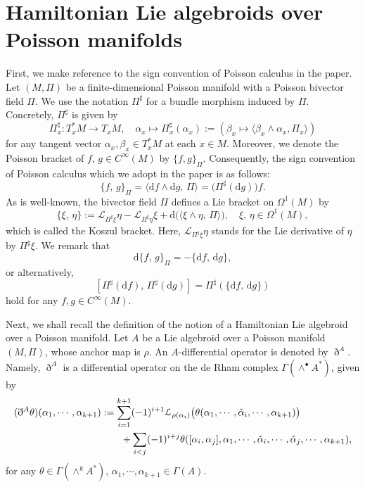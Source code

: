 \documentclass[a4paper,11pt,dvipdfmx]{article}
\numberwithin{equation}{section}
\begin{document}
\section{Hamiltonian Lie algebroids over Poisson manifolds}
First, we make reference to the sign convention of Poisson calculus in the paper. Let $(M,\Pi)$ be a finite-dimensional Poisson manifold with a Poisson bivector field $\Pi$. 
We use the notation $\Pi^{\sharp}$ for a bundle morphism induced by $\Pi$. Concretely, $\Pi^{\sharp}$ is given by 
\begin{equation}\label{sec2:eqn_sign convention}
\Pi^{\sharp}_x:T_x^*M \longrightarrow T_xM,\quad \alpha_x\longmapsto \Pi^{\sharp}_x(\alpha_x):=(\beta_x\mapsto \langle \beta_x\wedge\alpha_x, \Pi_x\rangle)
\end{equation}
for any tangent vector $\alpha_x,\beta_x\in T_x^*M$ at each $x\in M$. Moreover, we denote the Poisson bracket of $f,\,g\in C^{\infty}(M)$ by $\{f,g\}_{\Pi}$. 
Consequently, the sign convention of Poisson calculus which we adopt in the paper is as follows:
\begin{equation*}
 \{f,\,g\}_{\Pi}=\langle\mathrm{d}f\wedge\mathrm{d}g,\,\Pi\rangle = \bigl(\Pi^{\sharp}(\mathrm{d}g)\bigr)f. 
\end{equation*}
As is well-known, the bivector field $\Pi$ defines a Lie bracket on $\Omega^1(M)$ by 
\[
\{\xi,\,\eta\}:=\mathcal{L}_{\Pi^{\sharp}\xi}\eta - \mathcal{L}_{\Pi^{\sharp}\eta}\xi + \mathrm{d}\bigl(\langle \xi\wedge \eta,\,\Pi\rangle\bigr),\quad 
\xi,\,\eta\in \Omega^1(M), 
\]
which is called the Koszul bracket. Here, $\mathcal{L}_{\Pi^{\sharp}\xi}\eta$ stands for the Lie derivative of $\eta$ by $\Pi^{\sharp}\xi$. 
We remark that 
\begin{equation}\label{sec2:eqn_Koszul}
 \mathrm{d}\{f,\,g\}_{\Pi}=-\{\mathrm{d}f,\,\mathrm{d}g\}, 
\end{equation}
or alternatively, 
\begin{equation}\label{sec2:eqn_Koszul2}
 [\Pi^{\sharp}(\mathrm{d}f),\,\Pi^{\sharp}(\mathrm{d}g)] = \Pi^{\sharp}(\{\mathrm{d}f,\,\mathrm{d}g\})
\end{equation}
hold for any $f,g\in C^{\infty}(M)$. 
\medskip 

Next, we shall recall the definition of the notion of a Hamiltonian Lie algebroid over a Poisson manifold. 
Let $A$ be a Lie algebroid over a Poisson manifold $(M,\Pi)$, whose anchor map is $\rho$. 
An $A$-differential operator is denoted by $\eth^A$. Namely, $\eth^A$ is a differential operator on the de Rham complex $\varGamma(\wedge^\bullet A^*)$, given by 
\begin{align}
 (\eth^A\theta)(\alpha_1,\cdots,\alpha_{k+1})&:= \sum_{i=1}^{k+1}(-1)^{i+1}\mathcal{L}_{\rho(\alpha_i)}\bigl(\theta(\alpha_1,\cdots,\check{\alpha}_i,\cdots,\alpha_{k+1})\bigr)\notag \\
 &\hspace{2.0em}+ \sum_{i<j}(-1)^{i+j}\theta([\alpha_i,\alpha_j],\alpha_1,\cdots,\check{\alpha}_i,\cdots,\check{\alpha}_j,\cdots,\alpha_{k+1}), \label{sec2:eqn_diff}
\end{align}
for any $\theta\in\varGamma(\wedge^kA^*),\,\alpha_1,\cdots,\alpha_{k+1}\in \varGamma(A)$. 
\end{document}
